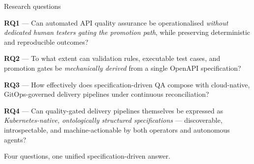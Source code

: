 \documentclass[11pt,aspectratio=169]{beamer}
\begin{document}
\begin{frame}{Research questions}

\footnotesize
\textbf{RQ1} --- Can automated API quality assurance be operationalised \emph{without dedicated human testers gating the promotion path}, while preserving deterministic and reproducible outcomes?

\vspace{0.6em}
\textbf{RQ2} --- To what extent can validation rules, executable test cases, and promotion gates be \emph{mechanically derived} from a single OpenAPI specification?

\vspace{0.6em}
\textbf{RQ3} --- How effectively does specification-driven QA compose with cloud-native, GitOps-governed delivery pipelines under continuous reconciliation?

\vspace{0.6em}
\textbf{RQ4} --- Can quality-gated delivery pipelines themselves be expressed as \emph{Kubernetes-native, ontologically structured specifications} --- discoverable, introspectable, and machine-actionable by both operators and autonomous agents?

\vspace{0.8em}
\begin{center}
\alert{Four questions, one unified specification-driven answer.}
\end{center}

\end{frame}
\end{document}
